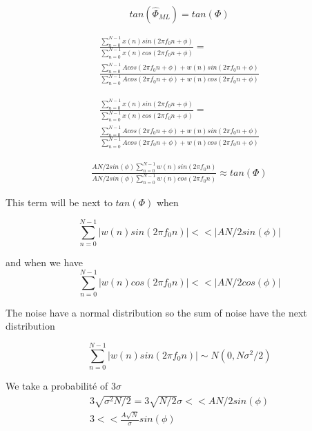 \documentclass{report}
\begin{document}
\begin{equation}\label{key}
tan(\hat{\Phi}_{ML} )= tan(\Phi)
\end{equation}



\begin{gather*}
\frac{\sum_{n=0}^{N-1}x(n)sin(2\pi f_0n+\phi)}{\sum_{n=0}^{N-1}x(n)cos(2\pi f_0n+\phi)} = \\
\frac{\sum_{n=0}^{N-1}Acos(2\pi f_0n+\phi)+w(n)sin(2\pi f_0n+\phi)}{\sum_{n=0}^{N-1}Acos(2\pi f_0n+\phi)+w(n)cos(2\pi f_0n+\phi)}
\end{gather*}


\begin{gather*}
\frac{\sum_{n=0}^{N-1}x(n)sin(2\pi f_0n+\phi)}{\sum_{n=0}^{N-1}x(n)cos(2\pi f_0n+\phi)} = \\
\frac{\sum_{n=0}^{N-1}Acos(2\pi f_0n+\phi)+w(n)sin(2\pi f_0n+\phi)}{\sum_{n=0}^{N-1}Acos(2\pi f_0n+\phi)+w(n)cos(2\pi f_0n+\phi)}
\end{gather*}



\begin{gather*}
\frac{AN/2 sin(\phi)\sum_{n=0}^{N-1}w(n)sin(2\pi f_0n)}{AN/2 sin(\phi)\sum_{n=0}^{N-1}w(n)cos(2\pi f_0n)} \approx tan(\Phi)
\end{gather*}

This term will be next to $tan(\Phi)$ when 

\begin{equation}\label{key}
\sum_{n=0}^{N-1}|w(n)sin(2\pi f_0n)|<<|AN/2 sin(\phi)|
\end{equation}

and when we have 
\begin{equation}\label{key}
\sum_{n=0}^{N-1}|w(n)cos(2\pi f_0n)|<<|AN/2 cos(\phi)|
\end{equation}

The noise have a normal distribution so the sum of noise have the next distribution

\begin{equation}\label{key}
\sum_{n=0}^{N-1}|w(n)sin(2\pi f_0n)|\sim \textit{N}(0,N\sigma^2/2)
\end{equation}


We take a probabilité of 3$\sigma$
\begin{gather*}\label{key}
3\sqrt{\sigma^2 N/2} = 3\sqrt{N/2}\sigma << AN/2 sin(\phi)\\
3 << \frac{A\sqrt{N}}{\sigma}sin(\phi)
\end{gather*}
\end{document}
